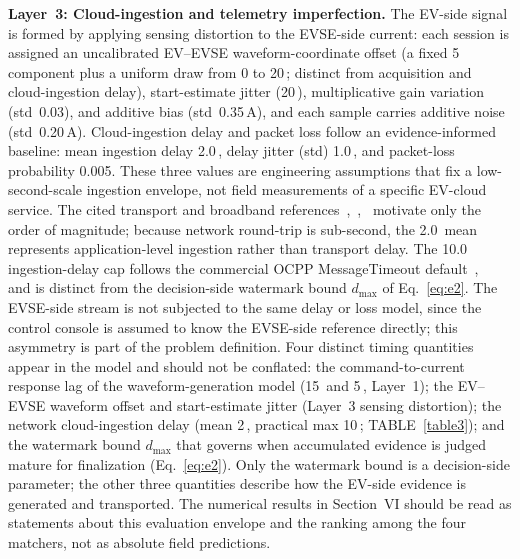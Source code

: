 \documentclass{ieeeaccess}
\begin{document}
    \textbf{Layer~3: Cloud-ingestion and telemetry imperfection.}
    The EV-side signal is formed by applying sensing distortion to the EVSE-side current: each session is assigned an uncalibrated EV--EVSE waveform-coordinate offset (a fixed 5\, component plus a uniform draw from 0 to 20\,; distinct from acquisition and cloud-ingestion delay), start-estimate jitter (20\,), multiplicative gain variation (std~0.03), and additive bias (std~0.35\,A), and each sample carries additive noise (std~0.20\,A).
    Cloud-ingestion delay and packet loss follow an evidence-informed baseline: mean ingestion delay 2.0\,, delay jitter (std) 1.0\,, and packet-loss probability 0.005. These three values are engineering assumptions that fix a low-second-scale ingestion envelope, not field measurements of a specific EV-cloud service. The cited transport and broadband references~\cite{b23},~\cite{b24},~\cite{b25} motivate only the order of magnitude; because network round-trip is sub-second, the 2.0\, mean represents application-level ingestion rather than transport delay. The 10.0\, ingestion-delay cap follows the commercial OCPP MessageTimeout default~\cite{bzaptec},~\cite{b22} and is distinct from the decision-side watermark bound $d_{\max}$ of Eq.~\eqref{eq:e2}.
    The EVSE-side stream is not subjected to the same delay or loss model, since the control console is assumed to know the EVSE-side reference directly; this asymmetry is part of the problem definition.
    Four distinct timing quantities appear in the model and should not be conflated: the command-to-current response lag of the waveform-generation model (15\, and 5\,, Layer~1); the EV--EVSE waveform offset and start-estimate jitter (Layer~3 sensing distortion); the network cloud-ingestion delay (mean 2\,, practical max 10\,; TABLE~\ref{table3}); and the watermark bound $d_{\max}$ that governs when accumulated evidence is judged mature for finalization (Eq.~\eqref{eq:e2}). Only the watermark bound is a decision-side parameter; the other three quantities describe how the EV-side evidence is generated and transported.
    The numerical results in Section~VI should be read as statements about this evaluation envelope and the ranking among the four matchers, not as absolute field predictions.
\end{document}
